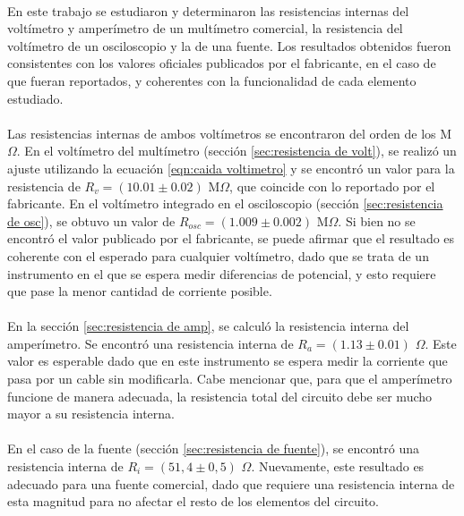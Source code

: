 \paragraph{}
En este trabajo se estudiaron y determinaron las resistencias internas del voltímetro y amperímetro de un multímetro comercial, la resistencia del voltímetro de un osciloscopio y la de una fuente. Los resultados obtenidos fueron consistentes con los valores oficiales publicados por el fabricante, en el caso de que fueran reportados, y coherentes con la funcionalidad de cada elemento estudiado.

\paragraph{}
Las resistencias internas de ambos voltímetros se encontraron del orden de los M$\Omega$. En el voltímetro del multímetro (sección \ref{sec:resistencia de volt}), se realizó un ajuste utilizando la ecuación \ref{eqn:caida voltimetro} y se encontró un valor para la resistencia de $R_v=(10.01\pm0.02)$ M$\Omega$, que coincide con lo reportado por el fabricante. En el voltímetro integrado en el osciloscopio (sección \ref{sec:resistencia de osc}), se obtuvo un valor de $R_{osc}=(1.009 \pm 0.002)$ M$\Omega$. Si bien no se encontró el valor publicado por el fabricante, se puede afirmar que el resultado es coherente con el esperado para cualquier voltímetro, dado que se trata de un instrumento en el que se espera medir diferencias de potencial, y esto requiere que pase la menor cantidad de corriente posible. 

\paragraph{}
En la sección \ref{sec:resistencia de amp}, se calculó la resistencia interna del amperímetro. Se encontró una resistencia interna de $R_a=(1.13 \pm 0.01)$ $\Omega$. Este valor es esperable dado que en este instrumento se espera medir la corriente que pasa por un cable sin modificarla. Cabe mencionar que, para que el amperímetro funcione de manera adecuada, la resistencia total del circuito debe ser mucho mayor a su resistencia interna.

\paragraph{}
En el caso de la fuente (sección \ref{sec:resistencia de fuente}), se encontró una resistencia interna de $R_i=(51,4 \pm 0,5)$ $\Omega$. Nuevamente, este resultado es adecuado para una fuente comercial, dado que requiere una resistencia interna de esta magnitud para no afectar el resto de los elementos del circuito.


